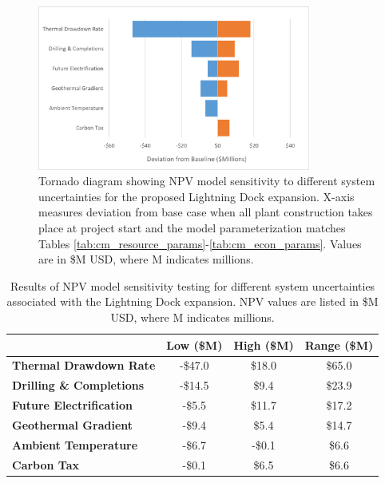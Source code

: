 \begin{figure}[!htp]
\centering
\includegraphics[width=0.8\textwidth]{templates/images/Figure-Tornado.png}
\singlespacing
\caption[Sensitivity testing tornado diagram]{Tornado diagram showing NPV model sensitivity to different system uncertainties for the proposed Lightning Dock expansion. X-axis measures deviation from base case when all plant construction takes place at project start and the model parameterization matches Tables \ref{tab:cm_resource_params}-\ref{tab:cm_econ_params}. Values are in \$M USD, where M indicates millions.}
\label{fig:tornado}
\end{figure}

\begin{table}[!htp]
\centering
\begin{tabular}{|l|c|c|c|}
\hline
\textbf{} & \textbf{Low (\$M)} & \textbf{High (\$M)} & \textbf{Range (\$M)} \\ \hline
\textbf{Thermal Drawdown Rate} & -\$47.0 & \$18.0 & \$65.0 \\ \hline
\textbf{Drilling \& Completions} & -\$14.5 & \$9.4 & \$23.9 \\ \hline
\textbf{Future Electrification} & -\$5.5 & \$11.7 & \$17.2 \\ \hline
\textbf{Geothermal Gradient} & -\$9.4 & \$5.4 & \$14.7 \\ \hline
\textbf{Ambient Temperature} & -\$6.7 & -\$0.1 & \$6.6 \\ \hline
\textbf{Carbon Tax} & -\$0.1 & \$6.5 & \$6.6 \\ \hline
\end{tabular}
\caption[Sensitivity testing results]{Results of NPV model sensitivity testing for different system uncertainties associated with the Lightning Dock expansion. NPV values are listed in \$M USD, where M indicates millions.}
\label{tab:tornado_table}
\end{table}


